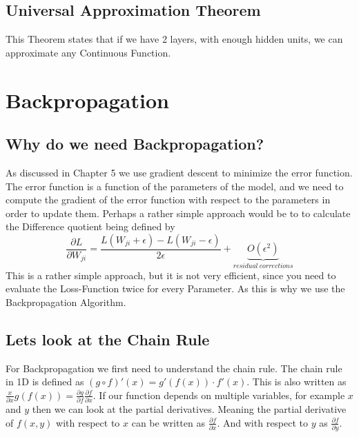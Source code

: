 \documentclass[a4paper]{article}
\begin{document}
\subsection{Universal Approximation Theorem}
This Theorem  states that if we have 2 layers, with enough hidden units, 
we can approximate any Continuous Function.

\section{Backpropagation}
\subsection{Why do we need Backpropagation?}
 As discussed in Chapter 5 we use gradient descent to minimize the error function. The error function is a function of the parameters of the model, and we need to compute the gradient of the error function with respect to the parameters in order to update them. 
 Perhaps a rather simple approach would be to to calculate the Difference quotient being defined by $$\frac{\partial L}{\partial W_{ji}} = \frac{L(W_{ji} + \epsilon) - L(W_{ji} - \epsilon)}{2 \epsilon} + \underbrace{O(\epsilon^{2})}_{residual \ corrections}$$ This is a rather simple approach, but it is not very efficient, since you need to evaluate the Loss-Function twice for every Parameter. As this is why we use the Backpropagation Algorithm.

 \subsection{Lets look at the Chain Rule}
 For Backpropagation we first need to understand the chain rule. The chain rule in 1D is defined as $(g \circ f)' (x) = g' (f(x)) \cdot f'(x)$. This is also written as $\frac{x}{\partial x} g(f(x)) = \frac{\partial g}{\partial f} \frac{\partial f}{\partial x}$.
 If our function depends on multiple variables, for example $x$ and $y$ then we can look at the partial derivatives. Meaning the partial derivative of $f(x,y) $ with respect to $x$ can be written as $\frac{\partial f}{\partial x}$. And with respect to $y$ as $\frac{\partial f}{\partial y}$. 

 \newpage
\end{document}
